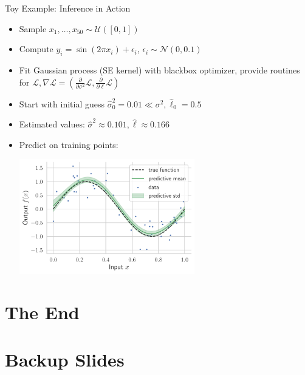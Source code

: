 \documentclass{beamer}
\begin{document}
\begin{frame}{Toy Example: Inference in Action}
\begin{itemize}[<+->]
    \item Sample $ x_1, \ldots, x_{50} \sim \mathcal U([0,1])$
    \item Compute $y_i = \sin(2\pi x_i) + \epsilon_i$, $\epsilon_i \sim \mathcal N(0, 0.1)$
    \item Fit Gaussian process (SE kernel) with blackbox optimizer, provide routines for $\mathcal L, \nabla \mathcal L = (\frac{\partial}{\partial \sigma^2} \mathcal L, \frac{\partial}{\partial \ell} \mathcal L)$
    \item Start with initial guess $\hat \sigma^2_0 = 0.01 \ll \sigma^2, \hat \ell_0 = 0.5$
    \item Estimated values: $\hat\sigma^2 \approx 0.101, \hat \ell \approx 0.166$
    \item Predict on training points:
    \begin{center}
    \includegraphics[width=0.6\textwidth]{report/res/toy_example.pdf}
    \end{center}
\end{itemize}
\end{frame}

\section{The End}

\section{Backup Slides}
\end{document}
